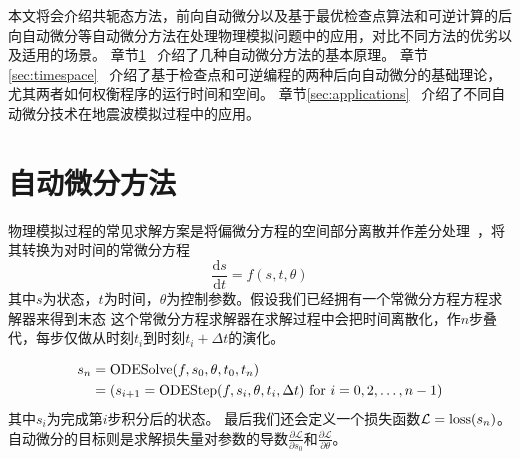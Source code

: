 \documentclass[A4,twoside,fontset=ubuntu,UTF8]{ctexart}
\def\D{\mathrm{d}}
\begin{document}
   本文将会介绍共轭态方法，前向自动微分以及基于最优检查点算法和可逆计算的后向自动微分等自动微分方法在处理物理模拟问题中的应用，对比不同方法的优劣以及适用的场景。
章节\ref{sec:forwardbackward}~ 介绍了几种自动微分方法的基本原理。
章节\ref{sec:timespace}~ 介绍了基于检查点和可逆编程的两种后向自动微分的基础理论，尤其两者如何权衡程序的运行时间和空间。
章节\ref{sec:applications}~ 介绍了不同自动微分技术在地震波模拟过程中的应用。

\section{自动微分方法}\label{sec:forwardbackward}

    物理模拟过程的常见求解方案是将偏微分方程的空间部分离散并作差分处理~\cite{Grote2010}，将其转换为对时间的常微分方程
    $$\frac{\D s}{\D t} = f(s, t, \theta)$$
其中$s$为状态，$t$为时间，$\theta$为控制参数。假设我们已经拥有一个常微分方程方程求解器来得到末态
这个常微分方程求解器在求解过程中会把时间离散化，作$n$步叠代，每步仅做从时刻$t_i$到时刻$t_{i}+\Delta t$的演化。

\begin{align}
    \begin{split}
    s_n &= \text{ODESolve}(f, s_0, \theta, t_0, t_n)\\
        &= (s_{i+1} = {\rm ODEStep}(f, s_{i}, \theta, t_i, \Delta t) ~\text{for $i=0,2, \ldots, n-1$})
    \end{split}
\end{align}
其中$s_i$为完成第$i$步积分后的状态。
最后我们还会定义一个损失函数$\mathcal{L} = {\rm loss}(s_n)$。
    自动微分的目标则是求解损失量对参数的导数$\frac{\partial \mathcal{L}}{\partial s_0}$和$\frac{\partial \mathcal{L}}{\partial \theta}$。
\end{document}
